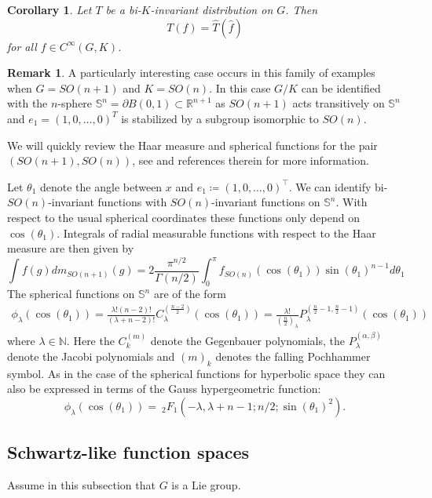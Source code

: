 \documentclass[12pt,reqno,a4paper]{amsart}
\theoremstyle{theorem}
\newtheorem{corollary}[theorem]{Corollary}
\theoremstyle{definition}
\newtheorem{remark}[theorem]{Remark}
\numberwithin{theorem}{section}
\numberwithin{equation}{section}
\newcommand{\R}{\mathbb{R}}
\begin{document}
\begin{corollary}\label{c:compact_ss_Bochner_Schwartz}
	Let $T$ be a bi-$K$-invariant distribution on $G$. Then 
	\[T(f) = \widehat{T}(\widehat{f})\]
	for all $f\in C^\infty(G, K)$.
\end{corollary}
\begin{remark}
	A particularly interesting case occurs in this family of examples when $G=SO(n+1)$ and $K=SO(n)$. In this case $G/K$ can be identified with the $n$-sphere $\mathbb{S}^n=\partial B(0,1)\subset \R^{n+1}$ as $SO(n+1)$ acts transitively on $\mathbb{S}^n$ and $e_1=(1,0,\dots, 0)^T$ is stabilized by a subgroup isomorphic to $SO(n)$. 
	
	We will quickly review the Haar measure and spherical functions for the pair $(SO(n+1), SO(n))$, see \cite{AnkerDunklTheory} and references therein for more information.
	
	Let $\theta_1$ denote the angle between $x$ and $e_1\coloneqq (1,0,\dots, 0)^\top$.
	We can identify bi-$SO(n)$-invariant functions with $SO(n)$-invariant functions on $\mathbb{S}^n$.
	With respect to the usual spherical coordinates these functions only depend on $\cos(\theta_1)$.
	Integrals of radial measurable functions with respect to the Haar measure are then given by
	\[\int f(g)dm_{SO(n+1)}(g) = 2\frac{\pi^{n/2}}{\Gamma(n/2)}\int_0^\pi f_{SO(n)}(\cos(\theta_1))\sin(\theta_1)^{n-1}d\theta_1\]
	The spherical functions on $\mathbb{S}^n$ are of the form
	\begin{align*}
	\phi_\lambda(\cos(\theta_1)) = \frac{\lambda!(n-2)!}{(\lambda+n-2)!}C_\lambda^{(\frac{n-2}{2})}(\cos(\theta_1))	=\frac{\lambda!}{(\frac{n}{2})_\lambda}P_\lambda^{(\frac{n}{2}-1,\frac{n}{2}-1)}(\cos(\theta_1))
	\end{align*}
	where $\lambda\in \mathbb{N}$. Here the $C_k^{(m)}$ denote the Gegenbauer polynomials, the $P_\lambda^{(\alpha,\beta)}$ denote the Jacobi polynomials and $(m)_k$ denotes the falling Pochhammer symbol. As in the case of the spherical functions for hyperbolic space they can also be expressed in terms of the Gauss hypergeometric function:
	\[\phi_\lambda(\cos(\theta_1)) = ~_2F_1(-\lambda, \lambda+n-1;n/2;\sin(\theta_1)^2).\] 
\end{remark}

\subsection{Schwartz-like function spaces}
Assume in this subsection that $G$ is a Lie group.
\end{document}
